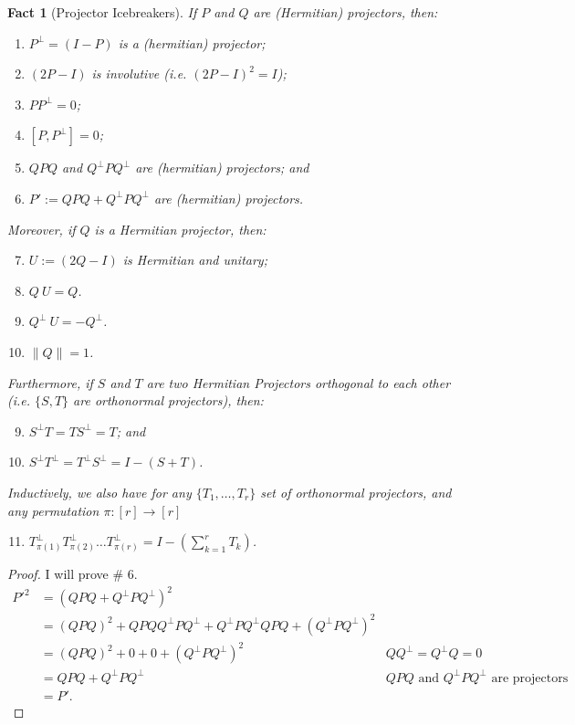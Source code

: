 \documentclass[12pt]{article}
\theoremstyle{plain}
\newtheorem{fact}[theorem]{Fact}
\begin{document}
\begin{fact}[Projector Icebreakers]\label{I-minus-P}
    If $P$ and $Q$ are (Hermitian) projectors, then:
    \begin{enumerate}
        \item $P^\bot = (I - P)$ is a (hermitian) projector;
        \item $\left(2P - I\right)$ is involutive (i.e. $\left(2P - I\right)^2 = I$);
        \item $P P^\bot = 0$;
        \item $[P, P^\bot] = 0$;
        \item $QPQ$ and $Q^\bot P Q^\bot$ are (hermitian) projectors; and
        \item $P' := QPQ + Q^\bot P Q^\bot$ are (hermitian) projectors.
    \end{enumerate}
Moreover, if $Q$ is a Hermitian projector, then:
\begin{enumerate}
\setcounter{enumi}{6}
    \item $U := (2Q - I)$ is Hermitian and unitary;
    \item $Q\ U = Q$.
    \item $Q^\bot\ U = -Q^\bot$.
    \item $\| Q\| = 1$.
\end{enumerate}
Furthermore, if $S$ and $T$ are two Hermitian Projectors orthogonal to each other (i.e. $\{S, T\}$ are orthonormal projectors), then:
\begin{enumerate}
\setcounter{enumi}{8}
    \item $S^\bot T = T S^\bot = T$; and
    \item $S^\bot T^\bot = T^\bot S^\bot = I - (S + T)$.
\end{enumerate}
Inductively, we also have for any $\{T_1, \dots, T_r\}$ set of orthonormal projectors, and any permutation $\pi: [r] \to [r]$
\begin{enumerate}
\setcounter{enumi}{10}
    \item $T_{\pi(1)}^\bot T_{\pi(2)}^\bot\dots T_{\pi(r)}^\bot = I - (\sum\limits_{k = 1}^r T_k)$.
\end{enumerate}


\end{fact}
\begin{proof}
    I will prove \# 6.
    \begin{align*}
        P'^2 &= \left(QPQ + Q^\bot P Q^\bot\right)^2\\
        &= (QPQ)^2 + QPQ Q^\bot P Q^\bot + Q^\bot P Q^\bot QPQ + \left(Q^\bot P Q^\bot\right)^2\\
        &= (QPQ)^2 + 0 + 0 + \left(Q^\bot P Q^\bot\right)^2 & QQ^\bot = Q^\bot Q = 0\\
        &= QPQ + Q^\bot P Q^\bot & QPQ \text{ and } Q^\bot P Q^\bot \text{ are projectors}\\
        &= P'.
    \end{align*}
\end{proof}
\end{document}
